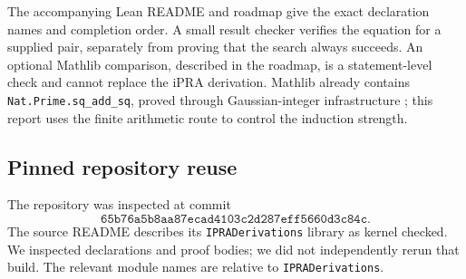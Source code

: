 \documentclass[11pt,letterpaper]{article}
\theoremstyle{definition}
\theoremstyle{remark}
\begin{document}
The accompanying Lean README and roadmap give the exact declaration
names and completion order. A small result checker verifies the equation
for a supplied pair, separately from proving that the search always
succeeds. An optional Mathlib comparison, described in the roadmap, is a
statement-level check and cannot replace the iPRA derivation.
Mathlib already contains \texttt{Nat.Prime.sq\_add\_sq}, proved through
Gaussian-integer infrastructure \cite{mathlib}; this report uses the
finite arithmetic route to control the induction strength.

\subsection{Pinned repository reuse}

The repository was inspected at commit
\[
 \texttt{65b76a5b8aa87ecad4103c2d287eff5660d3c84c}.
\]
The source README describes its \texttt{IPRADerivations} library as
kernel checked. We inspected declarations and proof bodies; we did not
independently rerun that build. The relevant module names are relative
to \texttt{IPRADerivations}.
\end{document}
